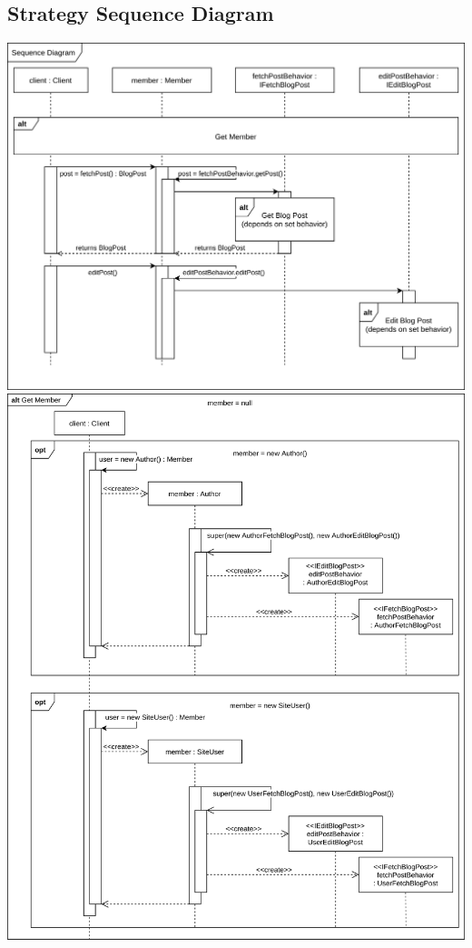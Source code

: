 \documentclass[12pt]{article}
\begin{document}
\subsection*{Strategy Sequence Diagram}
\includegraphics[width=\linewidth]{Sequence-Diagram-Strategy.png}
\newpage
\includegraphics[width=\linewidth]{Sequence-Diagram-Strategy-1.png}
\newpage
\end{document}
